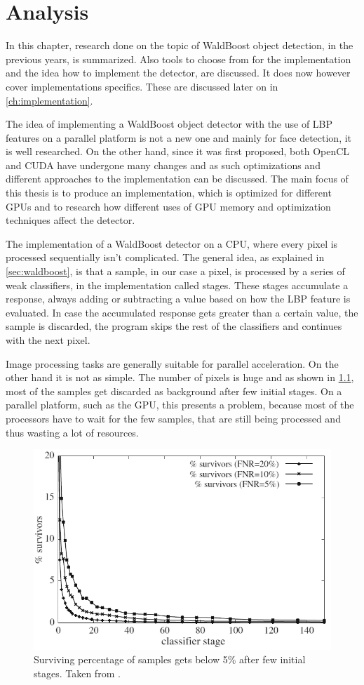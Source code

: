 \chapter{Analysis}

In this chapter, research done on the topic of WaldBoost object detection, in the previous years, is summarized. Also tools to choose from for the implementation and the idea how to implement the detector, are discussed. It does now however cover implementations specifics. These are discussed later on in \ref{ch:implementation}.

The idea of implementing a WaldBoost object detector with the use of LBP features on a parallel platform is not a new one and mainly for face detection, it is well researched. On the other hand, since it was first proposed, both OpenCL and CUDA have undergone many changes and as such optimizations and different approaches to the implementation can be discussed. The main focus of this thesis is to produce an implementation, which is optimized for different GPUs and to research how different uses of GPU memory and optimization techniques affect the detector.

The implementation of a WaldBoost detector on a CPU, where every pixel is processed sequentially isn't complicated. The general idea, as explained in \ref{sec:waldboost}, is that a sample, in our case a pixel, is processed by a series of weak classifiers, in the implementation called stages. These stages accumulate a response, always adding or subtracting a value based on how the LBP feature is evaluated. In case the accumulated response gets greater than a certain value, the sample is discarded, the program skips the rest of the classifiers and continues with the next pixel.

Image processing tasks are generally suitable for parallel acceleration. On the other hand it is not as simple. The number of pixels is huge and as shown in \ref{fig:survivors}, most of the samples get discarded as background after few initial stages. On a parallel platform, such as the GPU, this presents a problem, because most of the processors have to wait for the few samples, that are still being processed and thus wasting a lot of resources.

\begin{center}
\begin{figure}[h]
	\centering\includegraphics[width=0.6\linewidth]{fig/survivors.png}
	\caption{Surviving percentage of samples gets below 5\% after few initial stages. Taken from \cite{herout-realtime-cuda}.}
	\label{fig:survivors}
\end{figure}
\end{center}

